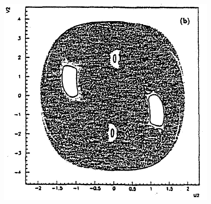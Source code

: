 \documentclass[a4,compress]{beamer}
\begin{document}
\begin{frame}
  \begin{columns}[c]
  \begin{column}{0.35\textwidth}
    \includegraphics[height=0.45\textheight]{ponicare-sections-e_30}


\end{column}
\end{columns}
\end{frame}
\end{document}
